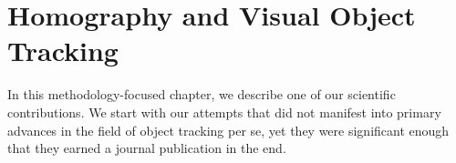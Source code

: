 \chapter{Homography and Visual Object Tracking}
\label{chap:HomographyAndVOT}

In this methodology-focused chapter, we describe one of our scientific contributions. We start with our attempts that did not manifest into primary advances in the field of object tracking per se, yet they were significant enough that they earned a journal publication in the end.







